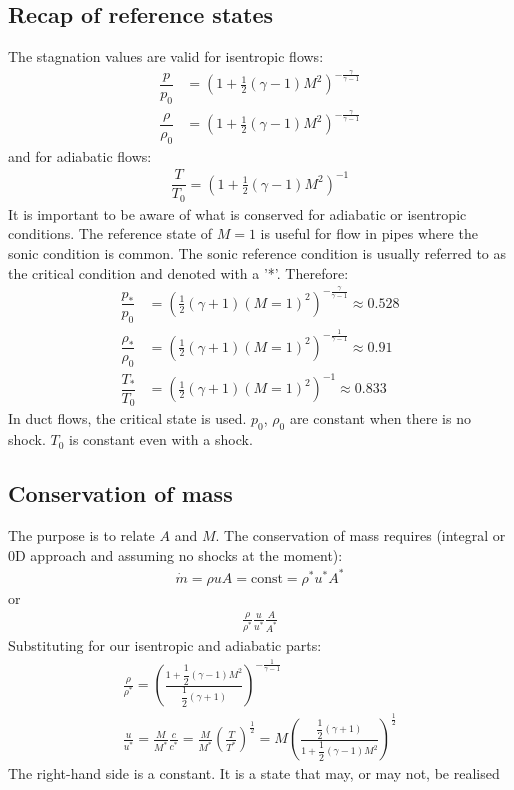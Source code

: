 \subsection{Recap of reference states}
The stagnation values are valid for isentropic flows:
\begin{align}
    \dfrac{p}{p_0}       & = \left(1 + \frac{1}{2}\left(\gamma - 1\right)M^2\right)^{-\frac{\gamma}{\gamma - 1}} \\
    \dfrac{\rho}{\rho_0} & = \left(1 + \frac{1}{2}\left(\gamma - 1\right)M^2\right)^{-\frac{\gamma}{\gamma - 1}}
\end{align}
and for adiabatic flows:
\begin{gather}
    \dfrac{T}{T_0} = \left(1 + \frac{1}{2}\left(\gamma - 1\right)M^2\right)^{-1}
\end{gather}
It is important to be aware of what is conserved for adiabatic or isentropic conditions. The reference state of $M = 1$ is useful for flow in pipes where the sonic condition is common. The sonic reference condition is usually referred to as the critical condition and denoted with a '*'. Therefore:
\begin{align}
    \dfrac{p_*}{p_0}       & = \left(\frac{1}{2}\left(\gamma + 1\right)(M=1)^2\right)^{-\frac{\gamma}{\gamma - 1}} \approx 0.528 \\
    \dfrac{\rho_*}{\rho_0} & = \left(\frac{1}{2}\left(\gamma + 1\right)(M=1)^2\right)^{-\frac{1}{\gamma - 1}}  \approx 0.91      \\
    \dfrac{T_*}{T_0}       & = \left(\frac{1}{2}\left(\gamma + 1\right)(M=1)^2\right)^{-1} \approx 0.833
\end{align}
In duct flows, the critical state is used. $p_0$, $\rho_0$ are constant when there is no shock. $T_0$ is constant even with a shock.
\subsection{Conservation of mass}
The purpose is to relate $A$ and $M$. The conservation of mass requires (integral or 0D approach and assuming no shocks at the moment):
\begin{gather}
    \dot{m} = \rho u A = \textrm{const} = \rho^* u^* A^*
\end{gather}
or
\begin{gather}
    \frac{\rho}{\rho^*} \frac{u}{u^*} \frac{A}{A^*}
\end{gather}
Substituting for our isentropic and adiabatic parts:
\begin{gather}
    \frac{\rho}{\rho^*} = \left(\frac{1 + \dfrac{1}{2}\left(\gamma - 1\right)M^2}{\dfrac{1}{2}\left(\gamma + 1 \right)}\right)^{-\frac{1}{\gamma - 1}}\\
    \frac{u}{u^*} = \frac{M}{M^*} \frac{c}{c^*} = \frac{M}{M^*}\left(\frac{T}{T^*}\right)^{\frac{1}{2}} = M \left(\frac{\dfrac{1}{2}\left(\gamma + 1\right)}{1 + \dfrac{1}{2}\left(\gamma - 1\right)M^2}\right)^{\frac{1}{2}}
\end{gather}
The right-hand side is a constant. It is a state that may, or may not, be realised
